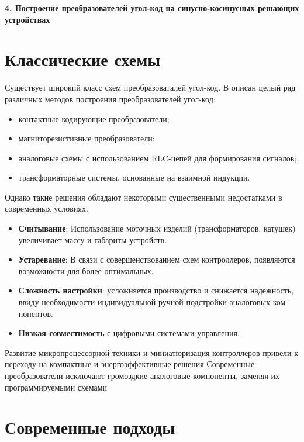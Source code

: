 \newpage

  \noindent\textbf{\large 4. Построение преобразователей угол-код на синусно-косинусных решающих устройствах}



\section{Классические схемы}

Существует широкий класс схем преобразоваталей угол-код.
В \cite{Vulvet} описан целый ряд различных методов построения преобразователей угол-код: 

\begin{itemize}
  \item контактные кодирующие преобразователи;
  \item магниторезистивные преобразователи;
  \item аналоговые схемы с использованием RLC-цепей для формирования сигналов;
  \item трансформаторные системы, основанные на взаимной индукции.
\end{itemize}

Однако такие решения обладают некоторыми существенными недостатками в современных условиях.
\begin{itemize}
  \item \textbf{Считывание}: Использование моточных изделий (трансформаторов, катушек) увеличивает массу и габариты устройств.
  \item \textbf{Устаревание}: В связи с совершенствованием схем контроллеров, появляются возможности для более оптимальных.
  \item \textbf{Сложность настройки}: усложняется производство и снижается надежность, ввиду необходимости индивидуальной ручной подстройки аналоговых ком­
понентов.
  \item \textbf{Низкая совместимость} с цифровыми системами управления.
\end{itemize}

Развитие микропроцессорной техники и миниатюризация контроллеров привели к переходу на компактные и энергоэффективные решения
Современные преобразователи исключают громоздкие аналоговые компоненты, заменяя их программируемыми схемами


\section{Современные подходы}

